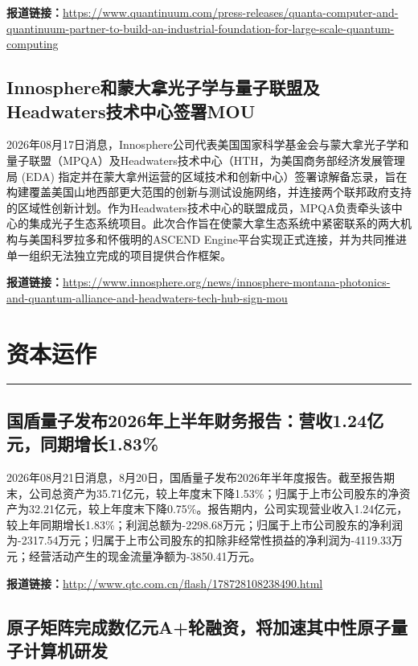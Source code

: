 \documentclass[12pt,a4paper]{ctexart}
\begin{document}
\noindent\textbf{报道链接：}\url{https://www.quantinuum.com/press-releases/quanta-computer-and-quantinuum-partner-to-build-an-industrial-foundation-for-large-scale-quantum-computing}

\subsection{ Innosphere和蒙大拿光子学与量子联盟及Headwaters技术中心签署MOU }

2026年08月17日消息，Innosphere公司代表美国国家科学基金会与蒙大拿光子学和量子联盟（MPQA）及Headwaters技术中心（HTH，为美国商务部经济发展管理局 (EDA) 指定并在蒙大拿州运营的区域技术和创新中心）签署谅解备忘录，旨在构建覆盖美国山地西部更大范围的创新与测试设施网络，并连接两个联邦政府支持的区域性创新计划。作为Headwaters技术中心的联盟成员，MPQA负责牵头该中心的集成光子生态系统项目。此次合作旨在使蒙大拿生态系统中紧密联系的两大机构与美国科罗拉多和怀俄明的ASCEND Engine平台实现正式连接，并为共同推进单一组织无法独立完成的项目提供合作框架。

\noindent\textbf{报道链接：}\url{https://www.innosphere.org/news/innosphere-montana-photonics-and-quantum-alliance-and-headwaters-tech-hub-sign-mou}


\newpage
\section{资本运作}
\vspace{-0.5em}
\noindent\rule{\linewidth}{1.5pt}

\subsection{ 国盾量子发布2026年上半年财务报告：营收1.24亿元，同期增长1.83\% }

2026年08月21日消息，8月20日，国盾量子发布2026年半年度报告。截至报告期末，公司总资产为35.71亿元，较上年度末下降1.53\%；归属于上市公司股东的净资产为32.21亿元，较上年度末下降0.75\%。报告期内，公司实现营业收入1.24亿元，较上年同期增长1.83\%；利润总额为-2298.68万元；归属于上市公司股东的净利润为-2317.54万元；归属于上市公司股东的扣除非经常性损益的净利润为-4119.33万元；经营活动产生的现金流量净额为-3850.41万元。

\noindent\textbf{报道链接：}\url{http://www.qtc.com.cn/flash/178728108238490.html}

\subsection{ 原子矩阵完成数亿元A+轮融资，将加速其中性原子量子计算机研发 }
\end{document}
